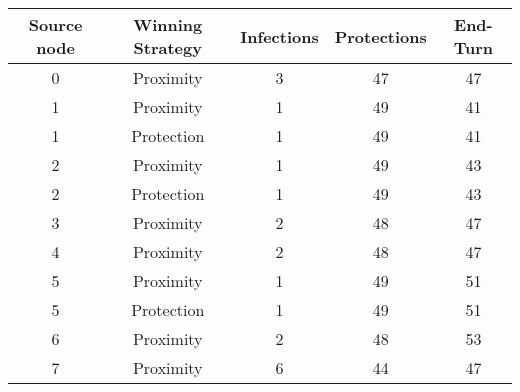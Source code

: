 \documentclass[results.tex]{subfiles}
\begin{document}
    \begin{center}
        \begin{tabular}{| c || c | c | c | c |}
            \hline
            {\bfseries Source node} & {\bfseries Winning Strategy} & {\bfseries Infections} & {\bfseries Protections}
            & {\bfseries End-Turn}
            \\  %
            \hline\hline
            0                       & Proximity                    & 3                      & 47                      & 47                   \\
            \hline
            1                       & Proximity                    & 1                      & 49                      & 41                   \\
            \hline
            1                       & Protection                   & 1                      & 49                      & 41                   \\
            \hline
            2                       & Proximity                    & 1                      & 49                      & 43                   \\
            \hline
            2                       & Protection                   & 1                      & 49                      & 43                   \\
            \hline
            3                       & Proximity                    & 2                      & 48                      & 47                   \\
            \hline
            4                       & Proximity                    & 2                      & 48                      & 47                   \\
            \hline
            5                       & Proximity                    & 1                      & 49                      & 51                   \\
            \hline
            5                       & Protection                   & 1                      & 49                      & 51                   \\
            \hline
            6                       & Proximity                    & 2                      & 48                      & 53                   \\
            \hline
            7                       & Proximity                    & 6                      & 44                      & 47                   \\

\end{tabular}
\end{center}
\end{document}
